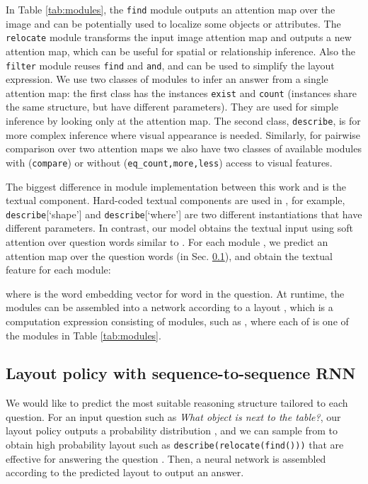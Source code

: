 \documentclass[10pt,twocolumn,letterpaper]{article}
\begin{document}
In Table \ref{tab:modules}, the \texttt{find} module outputs an attention map over the image and can be potentially used to localize some objects or attributes. The \texttt{relocate} module transforms the input image attention map and outputs a new attention map, which can be useful for spatial or relationship inference. Also the \texttt{filter} module reuses \texttt{find} and \texttt{and}, and can be used to simplify the layout expression. We use two classes of modules to infer an answer from a single attention map: the first class has the instances \texttt{exist} and \texttt{count} (instances share the same structure, but have different parameters). They are used for simple inference by looking only at the attention map. The second class, \texttt{describe}, is for more complex inference where visual appearance is needed. Similarly, for pairwise comparison over two attention maps we also have two classes of available modules with (\texttt{compare}) or without (\texttt{eq\_count,more,less}) access to visual features.

The biggest difference in module implementation between this work and \cite{andreas16neural} is the textual component. Hard-coded textual components are used in \cite{andreas16neural}, for example, \texttt{describe}[`shape'] and \texttt{describe}[`where'] are two different instantiations that have different parameters. In contrast, our model obtains the textual input using soft attention over question words similar to \cite{hu2017modeling}. For each module , we predict an attention map  over the  question words (in Sec. \ref{sec:gen_layout}), and obtain the textual feature  for each module:

where  is the word embedding vector for word  in the question. At runtime, the modules can be assembled into a network according to a layout , which is a computation expression consisting of modules, such as , where each of  is one of the modules in Table \ref{tab:modules}. 

\subsection{Layout policy with sequence-to-sequence RNN}\label{sec:gen_layout}

We would like to predict the most suitable reasoning structure tailored to each question. For an input question  such as \textit{What object is next to the table?}, our layout policy outputs a probability distribution , and we can sample from  to obtain high probability layout  such as \texttt{describe(relocate(find()))} that are effective for answering the question . Then, a neural network is assembled according to the predicted layout  to output an answer.
\end{document}
